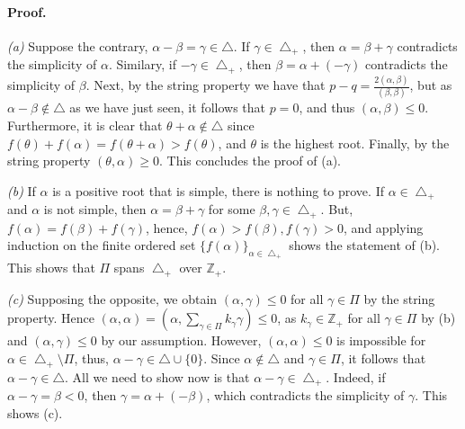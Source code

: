 \documentclass[11pt]{article}
\begin{document}
\paragraph{Proof.}
\textit{(a)} Suppose the contrary, $\alpha-\beta=\gamma \in \bigtriangleup$. If $\gamma \in \bigtriangleup_{+}$, then $\alpha=\beta+\gamma$ contradicts the simplicity of $\alpha$. Similary, if $-\gamma \in \bigtriangleup_{+}$, then $\beta=\alpha+(-\gamma)$ contradicts the simplicity of $\beta$. Next, by the string property we have that $p-q=\frac{2(\alpha, \beta)}{(\beta, \beta)}$, but as $\alpha-\beta \not \in \bigtriangleup$ as we have just seen, it follows that $p=0$, and thus $(\alpha, \beta) \leq 0$. Furthermore, it is clear that $\theta+\alpha \not \in \bigtriangleup$ since $f(\theta)+f(\alpha)=f(\theta+\alpha)> f(\theta)$, and $\theta$ is the highest root. Finally, by the string property $(\theta, \alpha)\geq 0$. This concludes the proof of (a).

\textit{(b)} If $\alpha$ is a positive root that is simple, there is nothing to prove. If $\alpha \in \bigtriangleup_{+}$ and $\alpha$ is not simple, then $\alpha=\beta+\gamma$ for some $\beta, \gamma \in \bigtriangleup_{+}$. But, $f(\alpha)=f(\beta)+f(\gamma)$, hence, $f(\alpha)>f(\beta), f(\gamma)> 0$, and applying induction on the finite ordered set ${\{f(\alpha)\}}_{\alpha \in \bigtriangleup_{+}}$ shows the statement of (b). This shows that $\Pi$ spans $\bigtriangleup_{+}$ over $\mathbb{Z}_{+}$. 


\textit{(c)} Supposing the opposite, we obtain $(\alpha, \gamma)\leq 0$ for all $\gamma \in \Pi$ by the string property. Hence $(\alpha, \alpha)=(\alpha, \sum_{\gamma \in \Pi} k_{\gamma} \gamma) \leq 0$, as $k_{\gamma} \in \mathbb{Z}_{+}$ for all $\gamma \in \Pi$ by (b) and $(\alpha, \gamma)\leq 0$ by our assumption. However, $(\alpha, \alpha)\leq 0$ is impossible for $\alpha \in \bigtriangleup_{+}\setminus \Pi$, thus, $\alpha-\gamma \in \bigtriangleup \cup \{0\}$. Since $\alpha \not \in \bigtriangleup$ and $\gamma \in \Pi$, it follows that $\alpha -\gamma \in \bigtriangleup$. All we need to show now is that $\alpha-\gamma \in \bigtriangleup_{+}$. Indeed, if $\alpha -\gamma=\beta <0$, then $\gamma=\alpha+(-\beta)$, which contradicts the simplicity of $\gamma$. This shows (c). 
  
\end{document}

